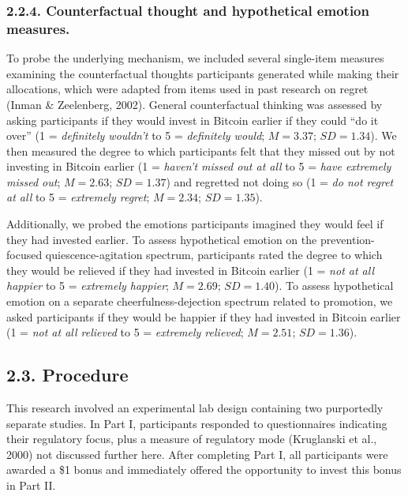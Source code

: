 \documentclass[man,floatsintext]{apa6}
\begin{document}
\hypertarget{counterfactual-thought-and-hypothetical-emotion-measures.}{%
\subsubsection{2.2.4. Counterfactual thought and hypothetical emotion measures.}\label{counterfactual-thought-and-hypothetical-emotion-measures.}}

To probe the underlying mechanism, we included several single-item measures examining the counterfactual thoughts participants generated while making their allocations, which were adapted from items used in past research on regret (Inman \& Zeelenberg, 2002). General counterfactual thinking was assessed by asking participants if they would invest in Bitcoin earlier if they could \enquote{do it over} (1 = \emph{definitely wouldn't} to 5 = \emph{definitely would}; \(M = 3.37\); \(SD = 1.34\)). We then measured the degree to which participants felt that they missed out by not investing in Bitcoin earlier (1 = \emph{haven't missed out at all} to 5 = \emph{have extremely missed out}; \(M = 2.63\); \(SD = 1.37\)) and regretted not doing so (1 = \emph{do not regret at all} to 5 = \emph{extremely regret}; \(M = 2.34\); \(SD = 1.35\)).

Additionally, we probed the emotions participants imagined they would feel if they had invested earlier. To assess hypothetical emotion on the prevention-focused quiescence-agitation spectrum, participants rated the degree to which they would be relieved if they had invested in Bitcoin earlier (1 = \emph{not at all happier} to 5 = \emph{extremely happier}; \(M = 2.69\); \(SD = 1.40\)). To assess hypothetical emotion on a separate cheerfulness-dejection spectrum related to promotion, we asked participants if they would be happier if they had invested in Bitcoin earlier (1 = \emph{not at all relieved} to 5 = \emph{extremely relieved}; \(M = 2.51\); \(SD = 1.36\)).

\hypertarget{procedure}{%
\subsection{2.3. Procedure}\label{procedure}}

This research involved an experimental lab design containing two purportedly separate studies. In Part I, participants responded to questionnaires indicating their regulatory focus, plus a measure of regulatory mode (Kruglanski et al., 2000) not discussed further here. After completing Part I, all participants were awarded a \$1 bonus and immediately offered the opportunity to invest this bonus in Part II.
\end{document}
